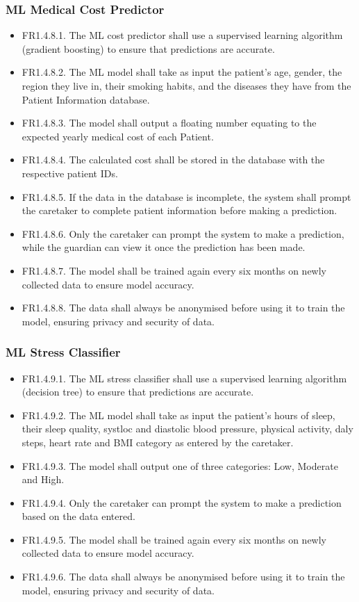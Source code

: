 \documentclass[12pt,a4paper]{article}
\begin{document}
\subsubsection{ML Medical Cost Predictor}
\begin{itemize}
    \item FR1.4.8.1. The ML cost predictor shall use a supervised learning algorithm (gradient boosting) to 
ensure that predictions are accurate. 
    \item FR1.4.8.2. The ML model shall take as input the patient’s age, gender, the region they live in, their 
smoking habits, and the diseases they have from the Patient Information database.  
    \item FR1.4.8.3. The model shall output a floating number equating to the expected yearly medical 
cost of each Patient.  
    \item FR1.4.8.4. The calculated cost shall be stored in the database with the respective patient IDs.   
    \item FR1.4.8.5. If the data in the database is incomplete, the system shall prompt the caretaker to 
complete patient information before making a prediction.  
    \item FR1.4.8.6. Only the caretaker can prompt the system to make a prediction, while the guardian 
can view it once the prediction has been made.
    \item FR1.4.8.7.  The model shall be trained again every six months on newly collected data to ensure 
model accuracy.  
    \item FR1.4.8.8. The data shall always be anonymised before using it to train the model, ensuring 
privacy and security of data. 
\end{itemize}

\subsubsection{ML Stress Classifier}
\begin{itemize}
    \item FR1.4.9.1. The ML stress classifier shall use a supervised learning algorithm (decision tree) to 
ensure that predictions are accurate. 
    \item FR1.4.9.2. The ML model shall take as input the patient’s hours of sleep, their sleep quality, systloc and diastolic blood pressure, physical activity, daly steps, heart rate and BMI category as entered by the caretaker.  
    \item FR1.4.9.3. The model shall output one of three categories: Low, Moderate and High. 
    \item FR1.4.9.4. Only the caretaker can prompt the system to make a prediction based on the data entered.   
    \item FR1.4.9.5.  The model shall be trained again every six months on newly collected data to ensure 
model accuracy.  
    \item FR1.4.9.6. The data shall always be anonymised before using it to train the model, ensuring 
privacy and security of data. 
\end{itemize}
\end{document}
